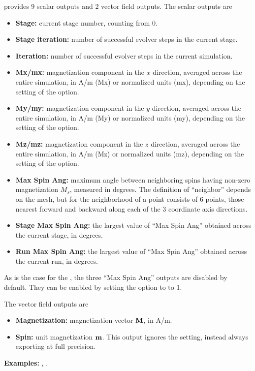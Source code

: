 \begin{description}
 provides 9 scalar outputs and 2 vector
field outputs.  The scalar outputs are
\begin{itemize}
\item \textbf{Stage:} current stage number, counting from 0.
\item \textbf{Stage iteration:} number of successful evolver steps
in the current stage.
\item \textbf{Iteration:} number of successful evolver steps in the
current simulation.
\item \textbf{Mx/mx:} magnetization component in the $x$ direction,
averaged across the entire simulation, in A/m (Mx) or normalized units
(mx), depending on the setting of the 
option.
\item \textbf{My/my:} magnetization component in the $y$ direction,
averaged across the entire simulation, in A/m (My) or normalized units
(my), depending on the setting of the 
option.
\item \textbf{Mz/mz:} magnetization component in the $z$ direction,
averaged across the entire simulation, in A/m (Mz) or normalized units
(mz), depending on the setting of the 
option.
\item \textbf{Max Spin Ang:} maximum angle between neighboring spins
having non-zero magnetization $M_s$, measured in degrees.  The definition
of ``neighbor'' depends on the mesh, but for 
the neighborhood of a point consists of 6 points, those nearest
forward and backward along each of the 3 coordinate axis directions.
\item \textbf{Stage Max Spin Ang:} the largest value of ``Max Spin
Ang'' obtained across the current stage, in degrees.
\item \textbf{Run Max Spin Ang:} the largest value of ``Max Spin
Ang'' obtained across the current run, in degrees.
\end{itemize}
As is the case for the , the three ``Max Spin Ang''
outputs are disabled by default.  They can be enabled by setting the
 option to to 1.

The vector field outputs are
\begin{itemize}
\item \textbf{Magnetization:} magnetization vector $\textbf{M}$, in A/m.
\item \textbf{Spin:} unit magnetization $\textbf{m}$.  This output ignores the
  setting, instead
always exporting at full precision.
\end{itemize}

\textbf{Examples:} , .

\end{description}

